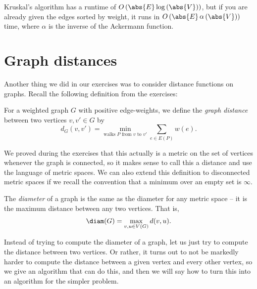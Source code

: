 \documentclass[nobib]{tufte-handout}
\begin{document}
\begin{remark}
  Kruskal's algorithm has a runtime of $O\left(\abs{E}\log\left(\abs{V}\right)\right)$, but if you are already given the edges sorted by weight, it runs in $O\left(\abs{E}\mathop{\alpha}\left(\abs{V}\right)\right)$ time, where $\alpha$ is the inverse of the Ackermann function.
\end{remark}

\section{Graph distances}

Another thing we did in our exercises was to consider distance functions on graphs. Recall the following definition from the exercises:

\begin{definition}
  For a weighted graph $G$ with positive edge-weights, we define the \emph{graph distance} between two vertices $v, v' \in G$ by
  $$d_G(v, v') = \min_{\text{walks }P\text{ from }v\text{ to }v'} \sum_{e \in E(P)} w(e).$$
\end{definition}

We proved during the exercises that this actually is a metric on the set of vertices whenever the graph is connected, so it makes sense to call this a distance and use the language of metric spaces. We can also extend this definition to disconnected metric spaces if we recall the convention that a minimum over an empty set is $\infty$.

\begin{definition}
  The \emph{diameter} of a graph is the same as the diameter for any metric space -- it is the maximum distance between any two vertices. That is,
  $$\diam(G) = \max_{v, u \in V(G)} d(v,u).$$
\end{definition}

Instead of trying to compute the diameter of a graph, let us just try to compute the distance between two vertices. Or rather, it turns out to not be markedly harder to compute the distance between a given vertex and every other vertex, so we give an algorithm that can do this, and then we will say how to turn this into an algorithm for the simpler problem.
\end{document}
